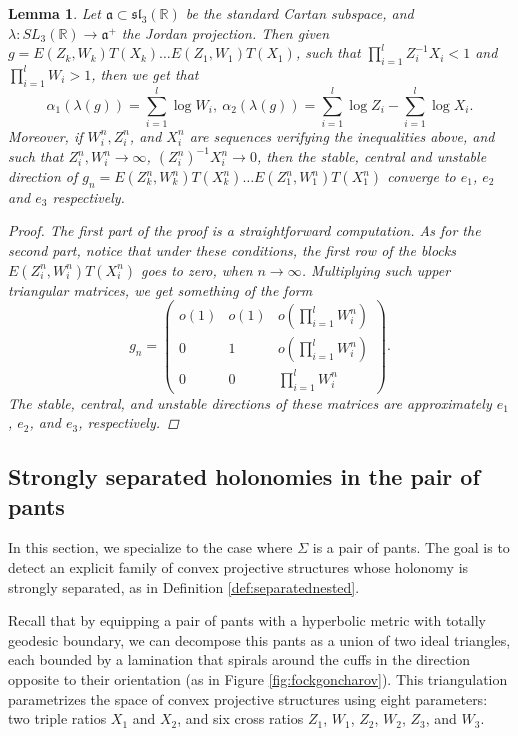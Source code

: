 \documentclass{amsart}
\newtheorem{lemma}[thm]{Lemma}
\theoremstyle{remark}
\theoremstyle{definition}
\begin{document}
\begin{lemma}
\label{lemma:eigenvalues}
 Let $\mathfrak{a} \subset \mathfrak{sl}_3 (\mathbb{R})$ be the standard Cartan subspace, and $\lambda : SL_3 (\mathbb{R}) \rightarrow \mathfrak{a}^+$ the Jordan projection.
 Then given $g = E(Z_k,W_k) T(X_k) \ldots E(Z_1,W_1) T(X_1)$, such that $\prod_{i=1}^l Z_i^{-1} X_i < 1$ and $\prod_{i=1}^l W_i > 1$, then we get that
 $$\alpha_1 (\lambda (g)) = \sum_{i=1}^l \log W_i, \: \alpha_2 (\lambda (g)) = \sum_{i=1}^l \log Z_i - \sum_{i=1}^l \log X_i .$$
 Moreover, if $W_i^n,Z_i^n$, and $X_i^n$ are sequences verifying the inequalities above, and such that $Z_i^n, W_i^n \to \infty$, $(Z_i^n)^{-1} X_i^n \to 0$, then the stable, central and unstable direction of $g_n = E(Z_k^n,W_k^n) T(X_k^n) \ldots E(Z_1^n,W_1^n) T(X_1^n)$ converge to $e_1$, $e_2$ and $e_3$ respectively. 
\begin{proof}
 The first part of the proof is a straightforward computation.
 As for the second part, notice that under these conditions, the first row of the blocks $E(Z_i^n, W_i^n) T(X_i^n)$ goes to zero, when $n \to \infty$.
 Multiplying such upper triangular matrices, we get something of the form
   $$g_n = 
   \begin{pmatrix}
 o(1) & o(1) & o(\prod_{i=1}^l W_i^n) \\
   0 & 1 & o(\prod_{i=1}^l W_i^n)\\
   0 & 0 & \prod_{i=1}^l W_i^n
   \end{pmatrix}.$$
 The stable, central, and unstable directions of these matrices are approximately $e_1$, $e_2$, and $e_3$, respectively.
\end{proof}
\end{lemma}

\subsection{Strongly separated holonomies in the pair of pants}
In this section, we specialize to the case where $\Sigma$ is a pair of pants.
The goal is to detect an explicit family of convex projective structures whose holonomy is strongly separated, as in Definition \ref{def:separatednested}.

Recall that by equipping a pair of pants with a hyperbolic metric with totally geodesic boundary, we can decompose this pants as a union of two ideal triangles, each bounded by a lamination that spirals around the cuffs in the direction opposite to their orientation (as in Figure \ref{fig:fockgoncharov}).
This triangulation parametrizes the space of convex projective structures using eight parameters: two triple ratios $X_1$ and $X_2$, and six cross ratios $ Z_1$, $ W_1$, $ Z_2$, $ W_2$, $ Z_3$, and $W_3$.
\end{document}

